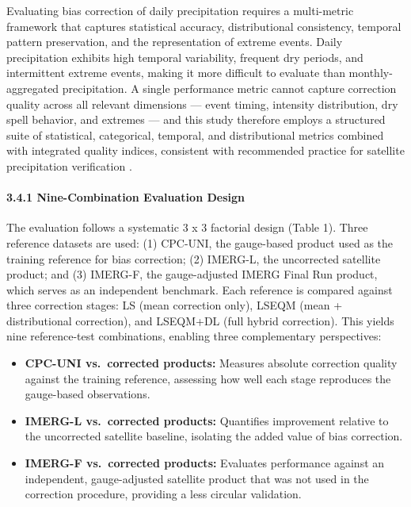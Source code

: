 \documentclass[
]{article}
\providecommand{\tightlist}{%
  \setlength{\itemsep}{0pt}\setlength{\parskip}{0pt}}
\begin{document}
Evaluating bias correction of daily precipitation requires a
multi-metric framework that captures statistical accuracy,
distributional consistency, temporal pattern preservation, and the
representation of extreme events. Daily precipitation exhibits high
temporal variability, frequent dry periods, and intermittent extreme
events, making it more difficult to evaluate than monthly-aggregated
precipitation. A single performance metric cannot capture correction
quality across all relevant dimensions --- event timing, intensity
distribution, dry spell behavior, and extremes --- and this study
therefore employs a structured suite of statistical, categorical,
temporal, and distributional metrics combined with integrated quality
indices, consistent with recommended practice for satellite
precipitation verification \cite{ref14,ref15}.

\paragraph{3.4.1 Nine-Combination Evaluation
Design}\label{nine-combination-evaluation-design}

The evaluation follows a systematic 3 x 3 factorial design (Table 1).
Three reference datasets are used: (1) CPC-UNI, the gauge-based product
used as the training reference for bias correction; (2) IMERG-L, the
uncorrected satellite product; and (3) IMERG-F, the gauge-adjusted IMERG
Final Run product, which serves as an independent benchmark. Each
reference is compared against three correction stages: LS (mean
correction only), LSEQM (mean + distributional correction), and LSEQM+DL
(full hybrid correction). This yields nine reference-test combinations,
enabling three complementary perspectives:

\begin{itemize}
\tightlist
\item
  \textbf{CPC-UNI vs.~corrected products:} Measures absolute correction
  quality against the training reference, assessing how well each stage
  reproduces the gauge-based observations.
\item
  \textbf{IMERG-L vs.~corrected products:} Quantifies improvement
  relative to the uncorrected satellite baseline, isolating the added
  value of bias correction.
\item
  \textbf{IMERG-F vs.~corrected products:} Evaluates performance against
  an independent, gauge-adjusted satellite product that was not used in
  the correction procedure, providing a less circular validation.
\end{itemize}
\end{document}

